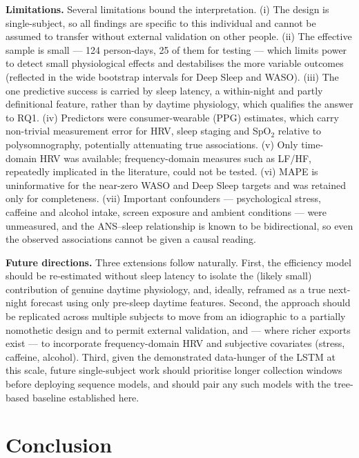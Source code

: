 \documentclass[fleqn,10pt]{wlscirep}
\begin{document}
\noindent\textbf{Limitations.} Several limitations bound the interpretation. (i) The design is single-subject, so all findings are specific to this individual and cannot be assumed to transfer without external validation on other people. (ii) The effective sample is small --- 124 person-days, 25 of them for testing --- which limits power to detect small physiological effects and destabilises the more variable outcomes (reflected in the wide bootstrap intervals for Deep Sleep and WASO). (iii) The one predictive success is carried by sleep latency, a within-night and partly definitional feature, rather than by daytime physiology, which qualifies the answer to RQ1. (iv) Predictors were consumer-wearable (PPG) estimates, which carry non-trivial measurement error for HRV, sleep staging and SpO$_2$ relative to polysomnography, potentially attenuating true associations. (v) Only time-domain HRV was available; frequency-domain measures such as LF/HF, repeatedly implicated in the literature, could not be tested. (vi) MAPE is uninformative for the near-zero WASO and Deep Sleep targets and was retained only for completeness. (vii) Important confounders --- psychological stress, caffeine and alcohol intake, screen exposure and ambient conditions --- were unmeasured, and the ANS--sleep relationship is known to be bidirectional, so even the observed associations cannot be given a causal reading.

\noindent\textbf{Future directions.} Three extensions follow naturally. First, the efficiency model should be re-estimated without sleep latency to isolate the (likely small) contribution of genuine daytime physiology, and, ideally, reframed as a true next-night forecast using only pre-sleep daytime features. Second, the approach should be replicated across multiple subjects to move from an idiographic to a partially nomothetic design and to permit external validation, and --- where richer exports exist --- to incorporate frequency-domain HRV and subjective covariates (stress, caffeine, alcohol). Third, given the demonstrated data-hunger of the LSTM at this scale, future single-subject work should prioritise longer collection windows before deploying sequence models, and should pair any such models with the tree-based baseline established here.


\section*{Conclusion}
\end{document}
